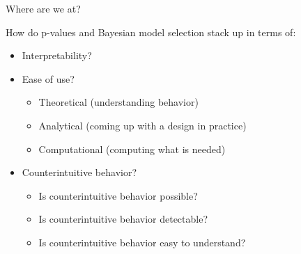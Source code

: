 \begin{frame}{Where are we at?}

How do p-values and Bayesian model selection stack up in terms of:

\begin{itemize}
    \item Interpretability?
    \item Ease of use?
        \begin{itemize}
        \item Theoretical (understanding behavior)
        \item Analytical (coming up with a design in practice)
        \item Computational (computing what is needed)
        \end{itemize}
    \item Counterintuitive behavior?
        \begin{itemize}
        \item Is counterintuitive behavior possible?
        \item Is counterintuitive behavior detectable?
        \item Is counterintuitive behavior easy to understand?
        \end{itemize}
\end{itemize}
%

\end{frame}
